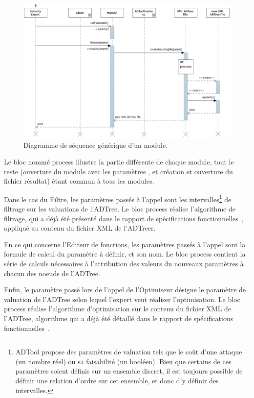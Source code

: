 	    \begin{figure}[H]
	        \centering
			\hspace*{-1.2cm}
	        \includegraphics[height=0.75\textwidth]{figure/moduleSeqDiag.png}
	        \caption{Diagramme de séquence générique d'un module.}
	        \label{fig:moduleseq}
	    \end{figure}

Le bloc nommé \og process \fg{} illustre la partie différente de chaque module, tout le reste (ouverture du module avec les paramètres , et création et ouverture du fichier résultat) étant commun à tous les modules.

Dans le cas du Filtre, les paramètres passés à l'appel sont les intervalles\footnote{ADTool propose des paramètres de valuation tels que le coût d'une attaque (un nombre réel) ou sa faisabilité (un booléen). Bien que certains de ces paramètres soient définis sur un ensemble discret, il est toujours possible de définir une relation d'ordre sur cet ensemble, et donc d'y définir des intervalles.} de filtrage sur les valuations de l'ADTree. Le bloc process réalise l'algorithme de filtrage, qui a déjà été présenté dans le rapport de spécifications fonctionnelles~\cite{spec_fonc}, appliqué au contenu du fichier XML de l'ADTreer.

En ce qui concerne l'Editeur de fonctions, les paramètres passés à l'appel sont la formule de calcul du paramètre à définir, et son nom. Le bloc process contient la série de calculs nécessaires à l'attribution des valeurs du nouveaux paramètres à chacun des noeuds de l'ADTree.  

Enfin, le paramètre passé lors de l'appel de l'Optimiseur désigne le paramètre de valuation de l'ADTree selon lequel l'expert veut réaliser l'optimisation. Le bloc process réalise l'algorithme d'optimisation sur le contenu du fichier XML de l'ADTree, algorithme qui a déjà été détaillé dans le rapport de spécifications fonctionnelles~\cite{spec_fonc}. 